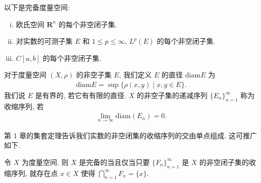 \documentclass[../../main.tex]{subfiles}
\begin{document}
\begin{theorem}\label{theorem:ch09-完备空间例子}
以下是完备度量空间:
\begin{enumerate}[(i)]
\item 欧氏空间 $\mathbf{R}^{n}$ 的每个非空闭子集.
\item 对实数的可测子集 $E$ 和 $1\leqslant p\leqslant\infty$, $L^{p}(E)$ 的每个非空闭子集.
\item $C[a,b]$ 的每个非空闭子集.
\end{enumerate}
\end{theorem}

\begin{definition}[直径与收缩序列]\label{definition:ch09-直径收缩}
对于度量空间 $(X,\rho)$ 的非空子集 $E$, 我们定义 $E$ 的直径 $\mathrm{diam}E$ 为
\begin{align*}
\mathrm{diam}E=\sup\{\rho(x,y)\mid x,y\in E\}.
\end{align*}
我们说 $E$ 是有界的, 若它有有限的直径. $X$ 的非空子集的递减序列 $\{E_{n}\}_{n=1}^{\infty}$ 称为收缩序列, 若
\begin{align*}
\lim_{n\to\infty}\mathrm{diam}(E_{n})=0.
\end{align*}
\end{definition}

第 1 章的集套定理告诉我们实数的非空闭集的收缩序列的交由单点组成. 这可推广如下.

\begin{theorem}\label{theorem:ch09-Cantor交}
令 $X$ 为度量空间. 则 $X$ 是完备的当且仅当只要 $\{F_{n}\}_{n=1}^{\infty}$ 是 $X$ 的非空闭子集的收缩序列, 就存在点 $x\in X$ 使得 $\bigcap_{n=1}^{\infty}F_{n}=\{x\}$.
\end{theorem}
\end{document}
